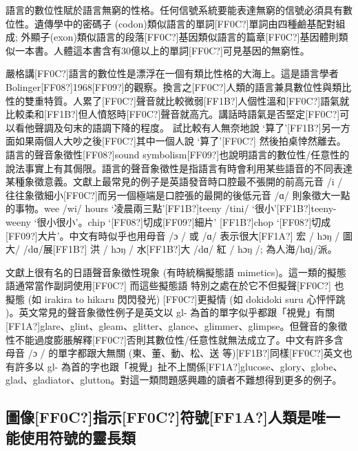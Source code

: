 語言的數位性賦於語言無窮的性格。任何信號系統要能表達無窮的信號必須具有數位性。遺傳學中的密碼子 (codon)類似語言的單詞[FF0C?]單詞由四種鹼基配對組成; 外顯子(exon)類似語言的段落[FF0C?]基因類似語言的篇章[FF0C?]基因體則類似一本書。人體這本書含有30億以上的單詞[FF0C?]可見基因的無窮性。

嚴格講[FF0C?]語言的數位性是漂浮在一個有類比性格的大海上。這是語言學者 Bolinger[FF08?]1968[FF09?]的觀察。換言之[FF0C?]人類的語言兼具數位性與類比性的雙重特質。人累了[FF0C?]聲音就比較微弱[FF1B?]人個性溫和[FF0C?]語氣就比較柔和[FF1B?]但人憤怒時[FF0C?]聲音就高亢。講話時語氣是否堅定[FF0C?]可以看他聲調及句末的語調下降的程度。 試比較有人無奈地說 ‘算了’[FF1B?]另一方面如果兩個人大吵之後[FF0C?]其中一個人說 ‘算了’[FF0C?] 然後拍桌悻然離去。語言的聲音象徵性[FF08?]sound symbolism[FF09?]也說明語言的數位性/任意性的說法事實上有其侷限。語言的聲音象徵性是指語言有時會利用某些語音的不同表達某種象徵意義。文獻上最常見的例子是英語發音時口腔最不張開的前高元音 /i /  往往象徵細小[FF0C?]而另一個極端是口腔張的最開的後低元音  /ɑ/  則象徵大一點的事物。wee /wi/ hours ‘凌晨兩三點’[FF1B?]teeny /tini/  ‘很小’[FF1B?]teeny-weeny ‘很小很小’。chip ‘[FF08?]切成[FF09?]細片’ [FF1B?]chop ‘[FF08?]切成[FF09?]大片’。中文有時似乎也用母音 /ɔ / 或 /ɑ/ 表示很大[FF1A?] 宏 / hɔŋ /  圖大/ /dɑ/展[FF1B?] 洪 / hɔŋ / 水[FF1B?]大 /dɑ/ 紅 / hɔŋ /; 為人海/hɑj/派。

文獻上很有名的日語聲音象徵性現象 (有時統稱擬態語 mimetics)。這一類的擬態語通常當作副詞使用[FF0C?] 而這些擬態語 特別之處在於它不但擬聲[FF0C?] 也擬態 (如 irakira to hikaru 閃閃發光) [FF0C?]更擬情 (如 dokidoki suru 心怦怦跳 )。英文常見的聲音象徵性例子是英文以 gl-  為首的單字似乎都跟「視覺」有關[FF1A?]glare、glint、gleam、glitter、glance、glimmer、glimpse。但聲音的象徵性不能過度膨脹解釋[FF0C?]否則其數位性/任意性就無法成立了。中文有許多含母音 /ɔ /  的單字都跟大無關 (東、董、動、松、送 等)[FF1B?]同樣[FF0C?]英文也有許多以 gl-  為首的字也跟「視覺」扯不上關係[FF1A?]glucose、glory、globe、glad、gladiator、glutton。對這一類問題感興趣的讀者不難想得到更多的例子。

\subsection{圖像[FF0C?]指示[FF0C?]符號[FF1A?]人類是唯一能使用符號的靈長類} %

